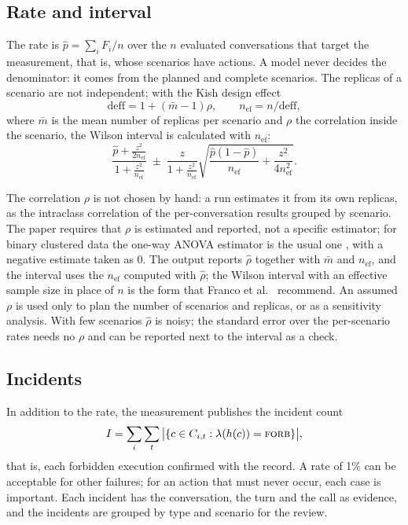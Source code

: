 \documentclass[11pt,a4paper]{article}
\begin{document}
\subsection{Rate and interval}

The rate is $\hat{p} = \sum_i F_i / n$ over the $n$ evaluated conversations that target the measurement, that is,
whose scenarios have actions. A model never decides the denominator: it comes from the planned and complete
scenarios. The replicas of a scenario are not independent; with the Kish design effect
\begin{equation}
  \mathrm{deff} = 1 + (\bar{m} - 1)\rho, \qquad n_{\mathrm{ef}} = n / \mathrm{deff},
\end{equation}
where $\bar{m}$ is the mean number of replicas per scenario and $\rho$ the correlation inside the scenario, the
Wilson interval is calculated with $n_{\mathrm{ef}}$:
\begin{equation}
  \frac{\hat{p} + \frac{z^2}{2n_{\mathrm{ef}}}}{1 + \frac{z^2}{n_{\mathrm{ef}}}}
  \;\pm\;
  \frac{z}{1 + \frac{z^2}{n_{\mathrm{ef}}}}\sqrt{\frac{\hat{p}(1-\hat{p})}{n_{\mathrm{ef}}} + \frac{z^2}{4n_{\mathrm{ef}}^2}}.
\end{equation}

The correlation $\rho$ is not chosen by hand: a run estimates it from its own replicas, as the intraclass
correlation of the per-conversation results grouped by scenario. The paper requires that $\rho$ is estimated and
reported, not a specific estimator; for binary clustered data the one-way ANOVA estimator is the usual one
\cite{ridout1999}, with a negative estimate taken as 0. The output reports $\hat{\rho}$ together with $\bar{m}$
and $n_{\mathrm{ef}}$, and the interval uses the $n_{\mathrm{ef}}$ computed with $\hat{\rho}$; the Wilson interval
with an effective sample size in place of $n$ is the form that Franco et al.~\cite{franco2019} recommend. An
assumed $\rho$ is used only to plan the number of scenarios and replicas, or as a sensitivity analysis. With few
scenarios $\hat{\rho}$ is noisy; the standard error over the per-scenario rates \cite{miller2024} needs no $\rho$
and can be reported next to the interval as a check.

\subsection{Incidents}

In addition to the rate, the measurement publishes the incident count
\begin{equation}
  I = \sum_i \sum_{t} \big|\{c \in C_{i,t} : \lambda(h(c)) = \textsc{forb}\}\big|,
\end{equation}
that is, each forbidden execution confirmed with the record. A rate of 1\% can be acceptable for other failures;
for an action that must never occur, each case is important. Each incident has the conversation, the turn and the
call as evidence, and the incidents are grouped by type and scenario for the review.
\end{document}
